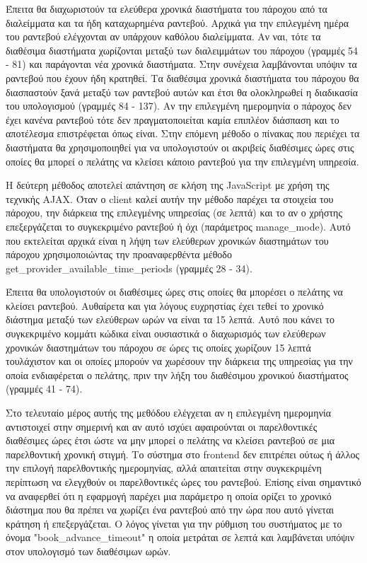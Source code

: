 Έπειτα θα διαχωριστούν τα ελεύθερα χρονικά διαστήματα του πάροχου από τα διαλείμματα και τα ήδη καταχωρημένα ραντεβού. Αρχικά για την επιλεγμένη ημέρα του ραντεβού ελέγχονται αν υπάρχουν καθόλου διαλείμματα. Αν ναι, τότε τα διαθέσιμα διαστήματα χωρίζονται μεταξύ των διαλειμμάτων του πάροχου (γραμμές 54 - 81) και παράγονται νέα χρονικά διαστήματα. Στην συνέχεια λαμβάνονται υπόψιν τα ραντεβού που έχουν ήδη κρατηθεί. Τα διαθέσιμα χρονικά διαστήματα του πάροχου θα διασπαστούν ξανά μεταξύ των ραντεβού αυτών και έτσι θα ολοκληρωθεί η διαδικασία του υπολογισμού (γραμμές 84 - 137). Αν την επιλεγμένη ημερομηνία ο πάροχος δεν έχει κανένα ραντεβού τότε δεν πραγματοποιείται καμία επιπλέον διάσπαση και το αποτέλεσμα επιστρέφεται όπως είναι. Στην επόμενη μέθοδο ο πίνακας που περιέχει τα διαστήματα θα χρησιμοποιηθεί για να υπολογιστούν οι ακριβείς διαθέσιμες ώρες στις οποίες θα μπορεί ο πελάτης να κλείσει κάποιο ραντεβού για την επιλεγμένη υπηρεσία.



Η δεύτερη μέθοδος αποτελεί απάντηση σε κλήση της JavaScript με χρήση της τεχνικής AJAX. Όταν ο client καλεί αυτήν την μέθοδο παρέχει τα στοιχεία του πάροχου, την διάρκεια της επιλεγμένης υπηρεσίας (σε λεπτά) και το αν ο χρήστης επεξεργάζεται το συγκεκριμένο ραντεβού ή όχι (παράμετρος manage\_mode). Αυτό που εκτελείται αρχικά είναι η λήψη των ελεύθερων χρονικών διαστημάτων του πάροχου χρησιμοποιώντας την προαναφερθέντα μέθοδο get\_provider\_available\_time\_periods (γραμμές 28 - 34). 

Έπειτα θα υπολογιστούν οι διαθέσιμες ώρες στις οποίες θα μπορέσει ο πελάτης να κλείσει ραντεβού. Αυθαίρετα και για λόγους ευχρηστίας έχει τεθεί το χρονικό διάστημα μεταξύ των ελεύθερων ωρών να είναι τα 15 λεπτά. Αυτό που κάνει το συγκεκριμένο κομμάτι κώδικα είναι ουσιαστικά ο διαχωρισμός των ελεύθερων χρονικών διαστημάτων του πάροχου σε ώρες τις οποίες χωρίζουν 15 λεπτά τουλάχιστον και οι οποίες μπορούν να χωρέσουν την διάρκεια της υπηρεσίας για την οποία ενδιαφέρεται ο πελάτης, πριν την λήξη του διαθέσιμου χρονικού διαστήματος (γραμμές 41 - 74).

Στο τελευταίο μέρος αυτής της μεθόδου ελέγχεται αν η επιλεγμένη ημερομηνία αντιστοιχεί στην σημερινή και αν αυτό ισχύει αφαιρούνται οι παρελθοντικές διαθέσιμες ώρες έτσι ώστε να μην μπορεί ο πελάτης να κλείσει ραντεβού σε μια παρελθοντική χρονική στιγμή. Το σύστημα στο frontend δεν επιτρέπει ούτως ή άλλος την επιλογή παρελθοντικής ημερομηνίας, αλλά απαιτείται στην συγκεκριμένη περίπτωση να ελεγχθούν οι παρελθοντικές ώρες του ραντεβού. Επίσης είναι σημαντικό να αναφερθεί ότι η εφαρμογή παρέχει μια παράμετρο η οποία ορίζει το χρονικό διάστημα που θα πρέπει να χωρίζει ένα ραντεβού από την ώρα που αυτό γίνεται κράτηση ή επεξεργάζεται. Ο λόγος γίνεται για την ρύθμιση του συστήματος με το όνομα "book\_advance\_timeout" η οποία μετράται σε λεπτά και λαμβάνεται υπόψιν στον υπολογισμό των διαθέσιμων ωρών.

